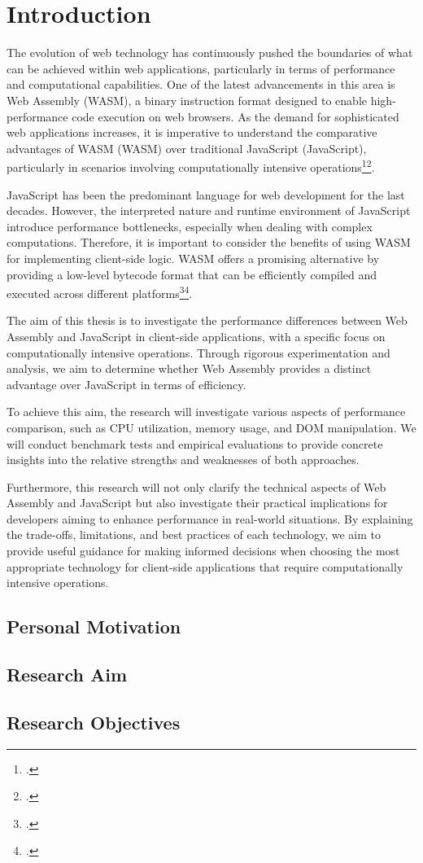 \newpage

\section{Introduction} \label{introduction}
The evolution of web technology has continuously pushed the boundaries of what can be achieved within web applications, particularly in terms of performance and computational capabilities. One of the latest advancements in this area is Web Assembly (WASM), a binary instruction format designed to enable high-performance code execution on web browsers. As the demand for sophisticated web applications increases, it is imperative to understand the comparative advantages of WASM (WASM) over traditional JavaScript (JavaScript), particularly in scenarios involving computationally intensive operations\footcite{reyes_webassembly_2018}\footcite{mozilla_webassembly_2024}.

JavaScript has been the predominant language for web development for the last decades. However, the interpreted nature and runtime environment of JavaScript introduce performance bottlenecks, especially when dealing with complex computations. Therefore, it is important to consider the benefits of using WASM for implementing client-side logic. WASM offers a promising alternative by providing a low-level bytecode format that can be efficiently compiled and executed across different platforms\footcite{reyes_webassembly_2018}\footcite{mozilla_webassembly_2024}.

The aim of this thesis is to investigate the performance differences between Web Assembly and JavaScript in client-side applications, with a specific focus on computationally intensive operations. Through rigorous experimentation and analysis, we aim to determine whether Web Assembly provides a distinct advantage over JavaScript in terms of efficiency.

To achieve this aim, the research will investigate various aspects of performance comparison, such as CPU utilization, memory usage, and DOM manipulation. We will conduct benchmark tests and empirical evaluations to provide concrete insights into the relative strengths and weaknesses of both approaches.

Furthermore, this research will not only clarify the technical aspects of Web Assembly and JavaScript but also investigate their practical implications for developers aiming to enhance performance in real-world situations. By explaining the trade-offs, limitations, and best practices of each technology, we aim to provide useful guidance for making informed decisions when choosing the most appropriate technology for client-side applications that require computationally intensive operations.

\subsection{Personal Motivation} \label{motivation}

\subsection{Research Aim} \label{aim}

\subsection{Research Objectives} \label{objectives}

